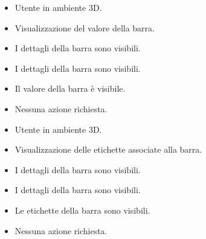\UCdsc
{ %
    \begin{itemize}
        \item Utente in ambiente 3D.
    \end{itemize}
}
{ %
    \begin{itemize}
        \item Visualizzazione del valore della barra.
    \end{itemize}
}
{ %
    \begin{itemize}
        \item I dettagli della barra sono visibili.
    \end{itemize}
}
{ %
    \begin{itemize}
        \item I dettagli della barra sono visibili.
        \item Il valore della barra è visibile.
    \end{itemize}
}
{ %
    \begin{itemize}
        \item Nessuna azione richiesta. 
    \end{itemize}
}

\UCdsc
{ %
    \begin{itemize}
        \item Utente in ambiente 3D.
    \end{itemize}
}
{ %
    \begin{itemize}
        \item Visualizzazione delle etichette associate alla barra.
    \end{itemize}
}
{ %
    \begin{itemize}
        \item I dettagli della barra sono visibili.
    \end{itemize}
}
{ %
    \begin{itemize}
        \item I dettagli della barra sono visibili.
        \item Le etichette della barra sono visibili.
    \end{itemize}
}
{ %
    \begin{itemize}
        \item Nessuna azione richiesta. 
    \end{itemize}
}

